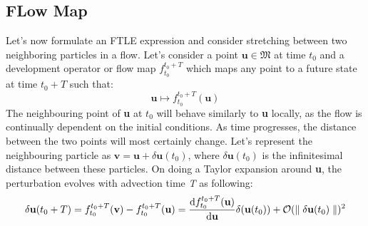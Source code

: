 \subsection{FLow Map}
Let's now formulate an FTLE expression and consider stretching between two neighboring particles in a flow. Let's consider a point $ \textbf{u}\in\mathfrak{M} $ at time $ t_{0} $ and a development operator or flow map $ f_{t_{0}}^{t_{0}+T} $ which maps any point to a future state at time $t_{0}+T$ such that:
\begin{equation}
\textbf{u}\mapsto f_{t_{0}}^{t_{0}+T}(\textbf{u})
\end{equation}
The neighbouring point of \textbf{u} at $t_{0}$ will behave similarly to \textbf{u} locally, as the flow is continually dependent on the initial conditions. As time progresses, the distance between the two points will most certainly change. Let's represent the neighbouring particle as $ \textbf{v} = \textbf{u} + \delta \textbf{u}(t_{0}) $, where $ \delta \textbf{u}(t_{0}) $ is the infinitesimal distance between these particles. On doing a Taylor expansion around \textbf{u}, the perturbation evolves with advection time \textit{T} as following:
\begin{equation} \label{flowmaptaylor}
\delta\textbf{u}(t_{0} + T) = f_{t_{0}}^{t_{0}+T}(\textbf{v}) - f_{t_{0}}^{t_{0}+T}(\textbf{u}) = \frac{\mathop{}\!\mathrm{d} f_{t_{0}}^{t_{0}+T}(\textbf{u})}{\mathop{}\!\mathrm{d}\textbf{u}}\delta(\textbf{u}(t_{0})) + \mathcal{O}(\parallel\delta\textbf{u}(t_{0})\parallel)^{2}
\end{equation}
 
